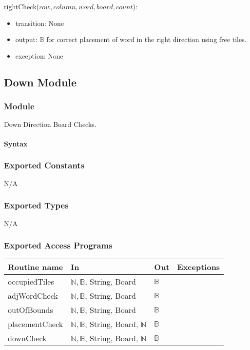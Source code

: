 \documentclass[12pt]{article}
\begin{document}
\noindent rightCheck($row, column, word, board, count$):
\begin{itemize}
\item transition: None
\item output: $\mathbb{B}$ for correct placement of word in the right direction using free tiles.
\item exception: None
\end{itemize}

\subsection*{Down Module}

\subsubsection*{Module}

Down Direction Board Checks.

\paragraph*{Syntax}

\subsubsection*{Exported Constants}
N/A
\subsubsection*{Exported Types}

N/A

\subsubsection* {Exported Access Programs}

\begin{tabular}{| l | l | l | l |}
\hline
\textbf{Routine name} & \textbf{In} & \textbf{Out} & \textbf{Exceptions}\\
\hline
occupiedTiles & $\mathbb{N}, \mathbb{B}$, String, Board & $\mathbb{B}$ & \\
\hline
adjWordCheck & $\mathbb{N}, \mathbb{B}$, String, Board & $\mathbb{B}$ & \\
\hline
outOfBounds & $\mathbb{N}, \mathbb{B}$, String, Board & $\mathbb{B}$ & \\
\hline
placementCheck & $\mathbb{N}, \mathbb{B}$, String, Board, $\mathbb{N}$ & $\mathbb{B}$ & \\
\hline
downCheck & $\mathbb{N}, \mathbb{B}$, String, Board, $\mathbb{N}$ & $\mathbb{B}$ & \\
\hline
\end{tabular}
\end{document}
